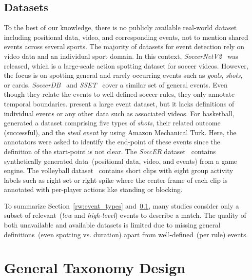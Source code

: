 \subsection{Datasets}\label{rw:datasets}

To the best of our knowledge, there is no publicly available real-world dataset including positional data, video, and corresponding events, not to mention shared events across several sports.
The majority of datasets for event detection rely on video data and an individual sport domain.
In this context, \emph{SoccerNetV2}~\cite{deliege2020soccernet, giancola2018soccernet} was released, which is a large-scale action spotting dataset for soccer videos. %
However, the focus is on spotting general and rarely occurring events such as \textit{goals}, \textit{shots}, or cards.
\emph{SoccerDB}~\cite{jiang2020soccerdb} and \emph{SSET}~\cite{feng2020sset} cover a similar set of general events. Even though they relate the events to well-defined soccer rules, they only annotate temporal boundaries.
\citet{pappalardo2019public} present a large event dataset, but it lacks definitions of individual events or any other data such as associated videos.
For basketball, \citet{Ramanathan_2016_CVPR} generated a dataset comprising five types of \textit{shots}, their related outcome (successful), and the \emph{steal event} by using Amazon Mechanical Turk. Here, the annotators were asked to identify the end-point of these events since the definition of the start-point is not clear. 
The \emph{SoccER} dataset~\cite{morra2020soccer} contains synthetically generated data~(positional data, video, and events) from a game engine. 
The volleyball dataset~\cite{ibrahim2016hierarchical} contains short clips with eight group activity labels such as right set or right spike where the center frame of each clip is annotated with per-player actions like standing or blocking. 

To summarize Section~\ref{rw:event_types} and~\ref{rw:datasets}, many studies consider only a subset of relevant~(\textit{low} and \textit{high-level}) events to describe a match.
The quality of both unavailable and available datasets is limited due to missing general definitions~(even spotting vs. duration) apart from well-defined~(per rule) events.

\section{General Taxonomy Design}\label{sec:taxonomy}

